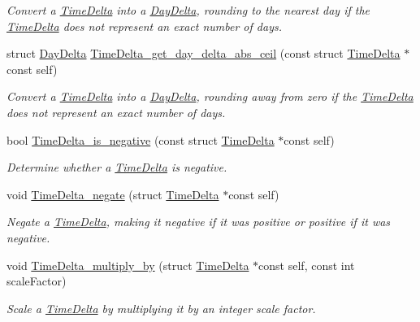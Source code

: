 \begin{DoxyCompactItemize}
\begin{DoxyCompactList}\small\item\em \-Convert a \hyperlink{structTimeDelta}{\-Time\-Delta} into a \hyperlink{structDayDelta}{\-Day\-Delta}, rounding to the nearest day if the \hyperlink{structTimeDelta}{\-Time\-Delta} does not represent an exact number of days. \end{DoxyCompactList}\item 
struct \hyperlink{structDayDelta}{\-Day\-Delta} \hyperlink{time-delta_8h_ad86ae02779b9fde0613cba364522ec99}{\-Time\-Delta\-\_\-get\-\_\-day\-\_\-delta\-\_\-abs\-\_\-ceil} (const struct \hyperlink{structTimeDelta}{\-Time\-Delta} $\ast$const self)
\begin{DoxyCompactList}\small\item\em \-Convert a \hyperlink{structTimeDelta}{\-Time\-Delta} into a \hyperlink{structDayDelta}{\-Day\-Delta}, rounding away from zero if the \hyperlink{structTimeDelta}{\-Time\-Delta} does not represent an exact number of days. \end{DoxyCompactList}\item 
bool \hyperlink{time-delta_8h_a8b0be83d6cd6ab623f05ea0eb5d560c7}{\-Time\-Delta\-\_\-is\-\_\-negative} (const struct \hyperlink{structTimeDelta}{\-Time\-Delta} $\ast$const self)
\begin{DoxyCompactList}\small\item\em \-Determine whether a \hyperlink{structTimeDelta}{\-Time\-Delta} is negative. \end{DoxyCompactList}\item 
void \hyperlink{time-delta_8h_a906aa66074e2d9ef675ea2d2a1d25084}{\-Time\-Delta\-\_\-negate} (struct \hyperlink{structTimeDelta}{\-Time\-Delta} $\ast$const self)
\begin{DoxyCompactList}\small\item\em \-Negate a \hyperlink{structTimeDelta}{\-Time\-Delta}, making it negative if it was positive or positive if it was negative. \end{DoxyCompactList}\item 
void \hyperlink{time-delta_8h_ab70f5dfbbe9363021f533a4b1e3bf2be}{\-Time\-Delta\-\_\-multiply\-\_\-by} (struct \hyperlink{structTimeDelta}{\-Time\-Delta} $\ast$const self, const int scale\-Factor)
\begin{DoxyCompactList}\small\item\em \-Scale a \hyperlink{structTimeDelta}{\-Time\-Delta} by multiplying it by an integer scale factor. \end{DoxyCompactList}\item 

\end{DoxyCompactItemize}

